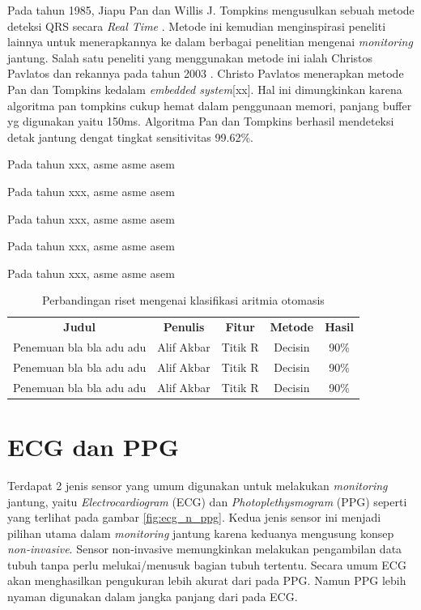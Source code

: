 Pada tahun 1985, Jiapu Pan dan Willis J. Tompkins mengusulkan sebuah metode deteksi QRS secara \textit{Real Time} \cite{pantom}. Metode ini kemudian menginspirasi peneliti lainnya untuk menerapkannya ke dalam berbagai penelitian mengenai \textit{monitoring} jantung. Salah satu peneliti yang menggunakan metode ini ialah Christos Pavlatos dan rekannya pada tahun 2003 \cite{pantom_hardware}. Christo Pavlatos menerapkan metode Pan dan Tompkins kedalam \textit{embedded system}[xx]. Hal ini dimungkinkan karena algoritma pan tompkins cukup hemat dalam penggunaan memori, panjang buffer yg digunakan yaitu 150ms. Algoritma Pan dan Tompkins berhasil mendeteksi detak jantung dengat tingkat sensitivitas 99.62\%.

Pada tahun xxx, asme asme asem

Pada tahun xxx, asme asme asem

Pada tahun xxx, asme asme asem

Pada tahun xxx, asme asme asem

Pada tahun xxx, asme asme asem

\begin{table}[H]
\centering
	\begin{tabular}{|c|c|c|c|c|}
	\hline
	\rowcolor{gray}
	\textbf{Judul} & \textbf{Penulis} & \textbf{Fitur} & \textbf{Metode}  & \textbf{Hasil}\\
	\cline{1-5}
	Penemuan bla bla adu adu & Alif Akbar & Titik R & Decisin & 90\% \\
	\cline{1-5}
	Penemuan bla bla adu adu & Alif Akbar & Titik R & Decisin & 90\% \\
	\cline{1-5}
	Penemuan bla bla adu adu & Alif Akbar & Titik R & Decisin & 90\% \\
	\hline
	\end{tabular}
	\caption{Perbandingan riset mengenai klasifikasi aritmia otomasis}
	\label{table:research_comparison}
\end{table}

\section{ECG dan PPG}
Terdapat 2 jenis sensor yang umum digunakan untuk melakukan \textit{monitoring} jantung, yaitu \textit{Electrocardiogram} (ECG) dan \textit{Photoplethysmogram} (PPG) seperti yang terlihat pada gambar \ref{fig:ecg_n_ppg}. Kedua jenis sensor ini menjadi pilihan utama dalam \textit{monitoring} jantung karena keduanya mengusung konsep \textit{non-invasive}. Sensor non-invasive memungkinkan melakukan pengambilan data tubuh tanpa perlu melukai/menusuk bagian tubuh tertentu. Secara umum ECG akan menghasilkan pengukuran lebih akurat dari pada PPG. Namun PPG lebih nyaman digunakan dalam jangka panjang dari pada ECG.


